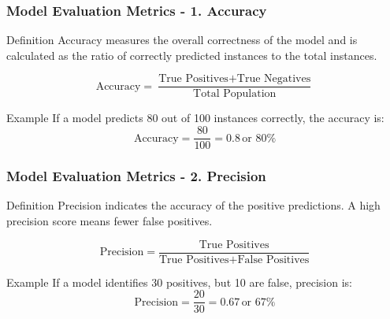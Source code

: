 \documentclass[aspectratio=169]{beamer}
\begin{document}
\begin{frame}[fragile]
    \frametitle{Model Evaluation Metrics - 1. Accuracy}
    \begin{block}{Definition}
        Accuracy measures the overall correctness of the model and is calculated as the ratio of correctly predicted instances to the total instances.
    \end{block}
    
    \begin{equation}
        \text{Accuracy} = \frac{\text{True Positives} + \text{True Negatives}}{\text{Total Population}}
    \end{equation}
    
    \begin{block}{Example}
        If a model predicts 80 out of 100 instances correctly, the accuracy is:
        \begin{equation}
            \text{Accuracy} = \frac{80}{100} = 0.8 \, \text{or } 80\%
        \end{equation}
    \end{block}
\end{frame}

\begin{frame}[fragile]
    \frametitle{Model Evaluation Metrics - 2. Precision}
    \begin{block}{Definition}
        Precision indicates the accuracy of the positive predictions. A high precision score means fewer false positives.
    \end{block}
    
    \begin{equation}
        \text{Precision} = \frac{\text{True Positives}}{\text{True Positives} + \text{False Positives}}
    \end{equation}
    
    \begin{block}{Example}
        If a model identifies 30 positives, but 10 are false, precision is:
        \begin{equation}
            \text{Precision} = \frac{20}{30} = 0.67 \, \text{or } 67\%
        \end{equation}
    \end{block}
\end{frame}
\end{document}
